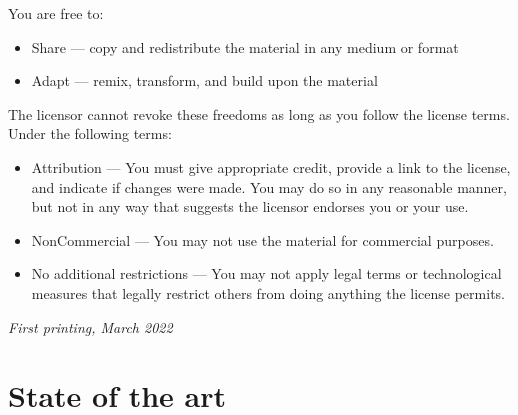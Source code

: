 \documentclass[
	10pt, %
	fleqn, %
	a5paper, %
]{LegrandOrangeBook}
\begin{document}
\noindent 
You are free to:
\begin{itemize}
\item Share — copy and redistribute the material in any medium or format
\item Adapt — remix, transform, and build upon the material
\end{itemize}
The licensor cannot revoke these freedoms as long as you follow the license terms.\\
Under the following terms:
\begin{itemize}
\item Attribution — You must give appropriate credit, provide a link to the license, and indicate if changes were made. You may do so in any reasonable manner, but not in any way that suggests the licensor endorses you or your use.
\item NonCommercial — You may not use the material for commercial purposes.
\item No additional restrictions — You may not apply legal terms or technological measures that legally restrict others from doing anything the license permits.
\end{itemize}
\noindent \textit{First printing, March 2022} %


\pagestyle{empty} %

\tableofcontents %

\listoffigures %

\listoftables %

\pagestyle{fancy} %

\cleardoublepage %


\part{State of the art}
\end{document}
